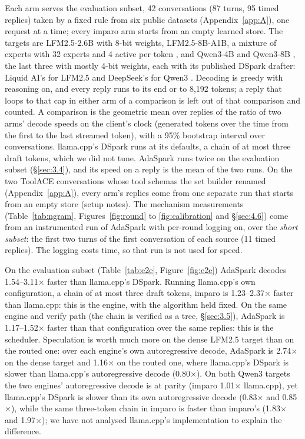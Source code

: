 \documentclass[10pt,twocolumn,letterpaper]{article}
\begin{document}
Each arm serves the evaluation subset, 42 conversations (87 turns, 95 timed replies) taken by a fixed rule from six public datasets (Appendix~\ref{app:A}), one request at a time; every imparo arm starts from an empty learned store. The targets are LFM2.5-2.6B with 8-bit weights, LFM2.5-8B-A1B, a mixture of experts with 32 experts and 4 active per token \cite{liquidai2026lfm2}, and Qwen3-4B and Qwen3-8B \cite{yang2025qwen3}, the last three with mostly 4-bit weights, each with its published DSpark drafter: Liquid AI's for LFM2.5 \cite{liquidai2026lfm2} and DeepSeek's for Qwen3 \cite{deepseekai2026dspark}. Decoding is greedy with reasoning on, and every reply runs to its end or to 8,192 tokens; a reply that loops to that cap in either arm of a comparison is left out of that comparison and counted. A comparison is the geometric mean over replies of the ratio of two arms' decode speeds on the client's clock (generated tokens over the time from the first to the last streamed token), with a 95\% bootstrap interval over conversations. llama.cpp's DSpark runs at its defaults, a chain of at most three draft tokens, which we did not tune. AdaSpark runs twice on the evaluation subset (\S\ref{sec:3.4}), and its speed on a reply is the mean of the two runs. On the two ToolACE conversations whose tool schemas the set builder renamed (Appendix~\ref{app:A}), every arm's replies come from one separate run that starts from an empty store (setup notes). The mechanism measurements (Table~\ref{tab:ngram}, Figures~\ref{fig:round} to \ref{fig:calibration} and \S\ref{sec:4.6}) come from an instrumented run of AdaSpark with per-round logging on, over the \emph{short subset}: the first two turns of the first conversation of each source (11 timed replies). The logging costs time, so that run is not used for speed.



On the evaluation subset (Table~\ref{tab:e2e}, Figure~\ref{fig:e2e}) AdaSpark decodes 1.54--3.11$\times$ faster than llama.cpp's DSpark. Running llama.cpp's own configuration, a chain of at most three draft tokens, imparo is 1.23--2.37$\times$ faster than llama.cpp: this is the engine, with the algorithm held fixed. On the same engine and verify path (the chain is verified as a tree, \S\ref{sec:3.5}), AdaSpark is 1.17--1.52$\times$ faster than that configuration over the same replies: this is the scheduler. Speculation is worth much more on the dense LFM2.5 target than on the routed one: over each engine's own autoregressive decode, AdaSpark is 2.74$\times$ on the dense target and 1.16$\times$ on the routed one, where llama.cpp's DSpark is slower than llama.cpp's autoregressive decode (0.80$\times$). On both Qwen3 targets the two engines' autoregressive decode is at parity (imparo 1.01$\times$ llama.cpp), yet llama.cpp's DSpark is slower than its own autoregressive decode (0.83$\times$ and 0.85$\times$), while the same three-token chain in imparo is faster than imparo's (1.83$\times$ and 1.97$\times$); we have not analysed llama.cpp's implementation to explain the difference.
\end{document}
